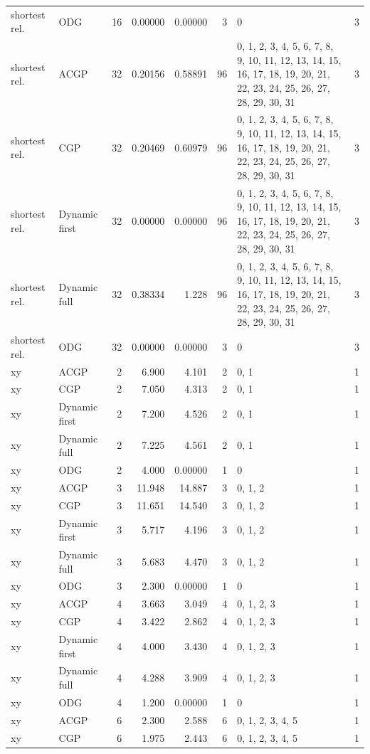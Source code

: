 \documentclass[10pt,a4paper]{article}
\begin{document}
\begin{longtable}{@{}p{23mm}p{29mm}rrrrp{36mm}r@{}}
shortest rel. & ODG & 16 & 0.00000 & 0.00000 & 3 & 0 & 3 \\
shortest rel. & ACGP & 32 & 0.20156 & 0.58891 & 96 & 0, 1, 2, 3, 4, 5, 6, 7, 8, 9, 10, 11, 12, 13, 14, 15, 16, 17, 18, 19, 20, 21, 22, 23, 24, 25, 26, 27, 28, 29, 30, 31 & 3 \\
shortest rel. & CGP & 32 & 0.20469 & 0.60979 & 96 & 0, 1, 2, 3, 4, 5, 6, 7, 8, 9, 10, 11, 12, 13, 14, 15, 16, 17, 18, 19, 20, 21, 22, 23, 24, 25, 26, 27, 28, 29, 30, 31 & 3 \\
shortest rel. & Dynamic first & 32 & 0.00000 & 0.00000 & 96 & 0, 1, 2, 3, 4, 5, 6, 7, 8, 9, 10, 11, 12, 13, 14, 15, 16, 17, 18, 19, 20, 21, 22, 23, 24, 25, 26, 27, 28, 29, 30, 31 & 3 \\
shortest rel. & Dynamic full & 32 & 0.38334 & 1.228 & 96 & 0, 1, 2, 3, 4, 5, 6, 7, 8, 9, 10, 11, 12, 13, 14, 15, 16, 17, 18, 19, 20, 21, 22, 23, 24, 25, 26, 27, 28, 29, 30, 31 & 3 \\
shortest rel. & ODG & 32 & 0.00000 & 0.00000 & 3 & 0 & 3 \\
xy & ACGP & 2 & 6.900 & 4.101 & 2 & 0, 1 & 1 \\
xy & CGP & 2 & 7.050 & 4.313 & 2 & 0, 1 & 1 \\
xy & Dynamic first & 2 & 7.200 & 4.526 & 2 & 0, 1 & 1 \\
xy & Dynamic full & 2 & 7.225 & 4.561 & 2 & 0, 1 & 1 \\
xy & ODG & 2 & 4.000 & 0.00000 & 1 & 0 & 1 \\
xy & ACGP & 3 & 11.948 & 14.887 & 3 & 0, 1, 2 & 1 \\
xy & CGP & 3 & 11.651 & 14.540 & 3 & 0, 1, 2 & 1 \\
xy & Dynamic first & 3 & 5.717 & 4.196 & 3 & 0, 1, 2 & 1 \\
xy & Dynamic full & 3 & 5.683 & 4.470 & 3 & 0, 1, 2 & 1 \\
xy & ODG & 3 & 2.300 & 0.00000 & 1 & 0 & 1 \\
xy & ACGP & 4 & 3.663 & 3.049 & 4 & 0, 1, 2, 3 & 1 \\
xy & CGP & 4 & 3.422 & 2.862 & 4 & 0, 1, 2, 3 & 1 \\
xy & Dynamic first & 4 & 4.000 & 3.430 & 4 & 0, 1, 2, 3 & 1 \\
xy & Dynamic full & 4 & 4.288 & 3.909 & 4 & 0, 1, 2, 3 & 1 \\
xy & ODG & 4 & 1.200 & 0.00000 & 1 & 0 & 1 \\
xy & ACGP & 6 & 2.300 & 2.588 & 6 & 0, 1, 2, 3, 4, 5 & 1 \\
xy & CGP & 6 & 1.975 & 2.443 & 6 & 0, 1, 2, 3, 4, 5 & 1 \\

\end{longtable}
\end{document}
